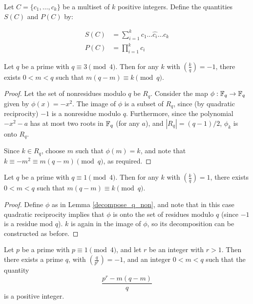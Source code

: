 \documentclass{article}
\begin{document}
\begin{defn}
  Let $C = \{c_1, \ldots, c_k\}$ be a multiset of $k$ positive
  integers. Define the quantities $S(C)$ and $P(C)$ by:

  \begin{align}
    S(C) &= \sum_{i=1}^kc_1 \ldots \hat{c_i} \ldots c_k\\
    P(C) &= \prod_{i=1}^kc_i
  \end{align}

\end{defn}

\begin{lem}
  \label{decompose_q_non}
  Let $q$ be a prime with $q \equiv 3 \pmod 4$. Then for any $k$
  with $\left( \frac{k}{q} \right) = -1$, there exists $0 < m < q$
  such that $m(q-m) \equiv k \pmod q$. 
\end{lem}
\begin{proof}
  Let the set of nonresidues modulo $q$ be $R_q$. Consider the map
  $\phi:\mathbb{F}_q \to \mathbb{F}_q$ given by $\phi(x) = -x^2$. The image of
  $\phi$ is a subset of $R_q$, since (by quadratic reciprocity)
  $-1$ is a nonresidue modulo $q$. Furthermore, since the polynomial
  $-x^2 - a$ has at most two roots in $\mathbb{F}_q$ (for any $a$), and
  $|R_q| = (q - 1)/2$, $\phi_k$ is onto $R_q$. 

  Since $k \in R_q$, choose $m$ such that $\phi(m) = k$, and note
  that $k \equiv -m^2 \equiv m(q-m) \pmod q$, as required.
\end{proof}
\begin{lem}
  \label{decompose_q_res}
  Let $q$ be a prime with $q \equiv 1 \pmod 4$. Then for any $k$
  with $\left( \frac{k}{q} \right) = 1$, there exists $0 < m < q$
  such that $m(q-m) \equiv k \pmod q$.
\end{lem}
\begin{proof}
  Define $\phi$ as in Lemma \ref{decompose_q_non}, and note that in
  this case quadratic reciprocity implies that $\phi$ is onto the set
  of residues modulo $q$ (since $-1$ is a residue mod $q$). $k$ is
  again in the image of $\phi$, so its decomposition can be
  constructed as before.
\end{proof}
\begin{prop}
  \label{exist_q}
  Let $p$ be a prime with $p \equiv 1 \pmod 4$, and let $r$ be an
  integer with $r > 1$. Then there exists a prime $q$, with $\left(
    \frac{q}{p^r} \right) = -1$, and an integer $0 < m < q$ such that
  the quantity
  \[\frac{p^r - m(q-m)}{q}\] 
  is a positive integer.
\end{prop}
\end{document}

